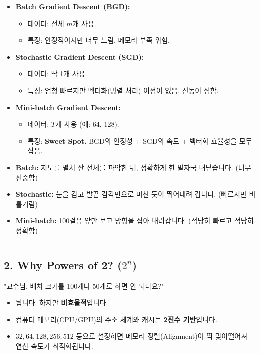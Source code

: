 \documentclass[11pt,a4paper]{book}
\theoremstyle{definition}
\begin{document}
\begin{itemize}
    \item \textbf{Batch Gradient Descent (BGD):} 
    \begin{itemize}
        \item 데이터: 전체 $m$개 사용.
        \item 특징: 안정적이지만 너무 느림. 메모리 부족 위험.
    \end{itemize}
    
    \item \textbf{Stochastic Gradient Descent (SGD):} 
    \begin{itemize}
        \item 데이터: 딱 1개 사용.
        \item 특징: 엄청 빠르지만 벡터화(병렬 처리) 이점이 없음. 진동이 심함.
    \end{itemize}
    
    \item \textbf{Mini-batch Gradient Descent:} 
    \begin{itemize}
        \item 데이터: $T$개 사용 (예: 64, 128).
        \item 특징: \textbf{Sweet Spot.} BGD의 안정성 + SGD의 속도 + 벡터화 효율성을 모두 잡음.
    \end{itemize}
\end{itemize}


\begin{analogybox}[title={산 내려오기 비유}]
\begin{itemize}
    \item \textbf{Batch:} 지도를 펼쳐 산 전체를 파악한 뒤, 정확하게 한 발자국 내딛습니다. (너무 신중함)
    \item \textbf{Stochastic:} 눈을 감고 발끝 감각만으로 미친 듯이 뛰어내려 갑니다. (빠르지만 비틀거림)
    \item \textbf{Mini-batch:} 100걸음 앞만 보고 방향을 잡아 내려갑니다. (적당히 빠르고 적당히 정확함)
\end{itemize}
\end{analogybox}

\vspace{0.5cm}\hrule\vspace{0.5cm}

\subsection{2. Why Powers of 2? ($2^n$)}
"교수님, 배치 크기를 100개나 50개로 하면 안 되나요?"
\begin{itemize}
    \item 됩니다. 하지만 \textbf{비효율적}입니다.
    \item 컴퓨터 메모리(CPU/GPU)의 주소 체계와 캐시는 \textbf{2진수 기반}입니다.
    \item $32, 64, 128, 256, 512$ 등으로 설정하면 메모리 정렬(Alignment)이 딱 맞아떨어져 연산 속도가 최적화됩니다.
\end{itemize}
\end{document}
